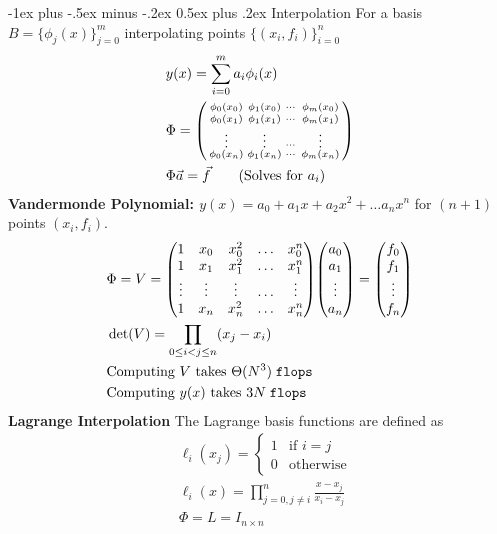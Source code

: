 \documentclass[letter, fleqn]{article}
\makeatletter
\renewcommand{\section}{\@startsection{section}{1}{0mm}%
                                {-1ex plus -.5ex minus -.2ex}%
                                {0.5ex plus .2ex}%
                                {\normalfont\large\bfseries}}
\newcommand{\flops}{\texttt{flops }}
\makeatother
\begin{document}
\begin{multicols}{3}
\section{Interpolation}
For a basis $B = \{\phi_j(x)\}_{j=0}^m$ interpolating points $\{(x_i, f_i)\}_{i=0}^n$ 
\begin{align*}
&y(x) = \sum_{i=0}^m a_i\phi_i(x)\\
&\Phi = \smqty(
\phi_0(x_0) & \phi_1(x_0) & \cdots &\phi_m(x_0) \\
\phi_0(x_1) & \phi_1(x_1) & \cdots &\phi_m(x_1) \\
\vdots & \vdots & \cdots & \vdots\\
\phi_0(x_n) & \phi_1(x_n) & \cdots &\phi_m(x_n) \\
)\\
&\Phi \Vec{a} = \Vec{f} \tag{Solves for $a_i$}
\end{align*}
\textbf{Vandermonde Polynomial: $y(x) = a_0 + a_1x + a_2x^2 + \ldots a_nx^n$} for $(n+1)$ points $(x_i, f_i)$. 
\begin{align*}
&\Phi = V = \mqty(
1 & x_0 & x_0^2 &\ldots & x_0^n\\
1 & x_1 & x_1^2 &\ldots & x_1^n\\
\vdots & \vdots & \vdots & \ldots &\vdots\\
1 & x_n & x_n^2 & \ldots &x_n^n\\
)\mqty(a_0 \\ a_1 \\ \vdots \\ a_n) = \mqty(f_0 \\ f_1 \\ \vdots \\ f_n)\\
&\det(V) = \prod_{0\leq i < j \leq n}(x_j - x_i)\\
&\text{Computing $V$ takes $\Theta(N^3) \;\flops$}\\
&\text{Computing $y(x)$ takes $3N \;\flops$}
\end{align*}
\textbf{Lagrange Interpolation} The Lagrange basis functions are defined as
\begin{align*}
&\ell_i(x_j) = \begin{cases}
1 & \text{if $i = j$}\\
0 & \text{otherwise}
\end{cases}\\
&\ell_i(x) = \prod_{j=0, j\neq i}^n \frac{x-x_j}{x_i-x_j} \tag{basis}\\
&\Phi = L = I_{n\times n} \\

\end{align*}
\end{multicols}
\end{document}
